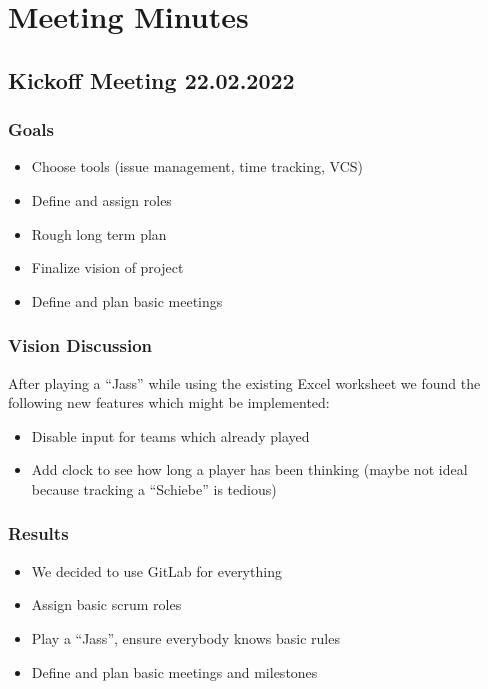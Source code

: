 \chapter{Meeting Minutes}


\section{Kickoff Meeting 22.02.2022}

\subsection{Goals}
\begin{itemize}
    \item Choose tools (issue management, time tracking, VCS)
    \item Define and assign roles
    \item Rough long term plan
    \item Finalize vision of project
    \item Define and plan basic meetings
\end{itemize}

\subsection{Vision Discussion}

After playing a ``Jass'' while using the existing Excel worksheet we found the following new features which might be implemented:

\begin{itemize}
    \item Disable input for teams which already played
    \item Add clock to see how long a player has been thinking (maybe not ideal because tracking a ``Schiebe'' is tedious)
\end{itemize}

\subsection{Results}
\begin{itemize}
    \item We decided to use GitLab for everything
    \item Assign basic scrum roles
    \item Play a ``Jass'', ensure everybody knows basic rules
    \item Define and plan basic meetings and milestones
\end{itemize}


